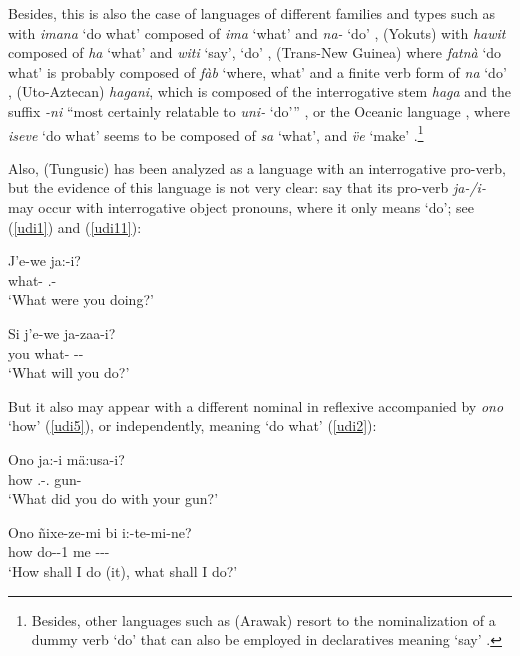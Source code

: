 \documentclass[output=paper]{langsci/langscibook}
\begin{document}
Besides, this is also the case of languages of different families and types
such as  with \emph{imana} `do what' composed of \emph{ima}
`what' and \emph{na-} `do' \citep{weber1989},   (Yokuts) with
\emph{hawit} composed of \emph{ha} `what' and \emph{witi} `say', `do'
\citep{gamble1978},  (Trans-New Guinea) where \emph{fatn\`a} `do what' is
probably composed of \emph{f\`ab} `where, what' and a finite verb form of
\emph{na} `do' \citep[see][]{fedden2011},  (Uto-Aztecan)
\emph{hagani}, which is composed of the interrogative stem \emph{haga} and the
suffix \emph{-ni} ``most certainly relatable to \emph{uni-} `do'{''}
\citep[89]{press1979}, or the Oceanic language , where \emph{iseve} `do
what' seems to be composed of \emph{sa} `what', and \emph{\"ve} `make'
\citep[312, fn. 46]{guerin2011}.\footnote{Besides, other languages such as
 (Arawak) resort to the nominalization of a dummy verb `do' that can also
be employed in declaratives meaning `say' \citep{danielsen2007}.}

Also,  (Tungusic) has been analyzed as a language with an
interrogative pro-verb, but the evidence of this language is not very clear:
\citet[352--353, 802]{nikolaeva.tolskaya2001} say that its pro-verb
\emph{ja-/i-} may occur with interrogative object pronouns, where it only means
`do'; see (\ref{udi1}) and (\ref{udi11}):

\begin{exe}
\ex \label{udi1} 
\sn\gll J'e-we ja:-i?\\
what-\Acc{} \Prov{}.\Pst-\Ssg{}\\
\glt `What were you doing?'

\ex \label{udi11} 
\sn\gll Si j'e-we ja-za\ng a-i?\\
you what-\Acc{} \Prov{}-\Fut{}-\Ssg{}\\
\glt `What will you do?'
\end{exe}

But it also may appear with a different nominal in reflexive accompanied by
\emph{ono} `how' (\ref{udi5}), or independently, meaning `do what'
(\ref{udi2}):

\begin{exe}
\ex \label{udi5} 
\sn\gll Ono ja:-i m\"a:usa-i?\\
how \Prov.\Pst-\Ssg.\glossF{} gun-\Refl{}\\
\glt `What did you do with your gun?'

\ex \label{udi2} 
\sn\gll Ono \~nixe-ze-mi bi i:-te-mi-ne?\\
how do-\Sbjv{}-1\Sg{} me \Prov{}-\Perm{}-\Fsg{}-\Cntr{}\\
\glt `How shall I do (it), what shall I do?'
\end{exe}
\end{document}
